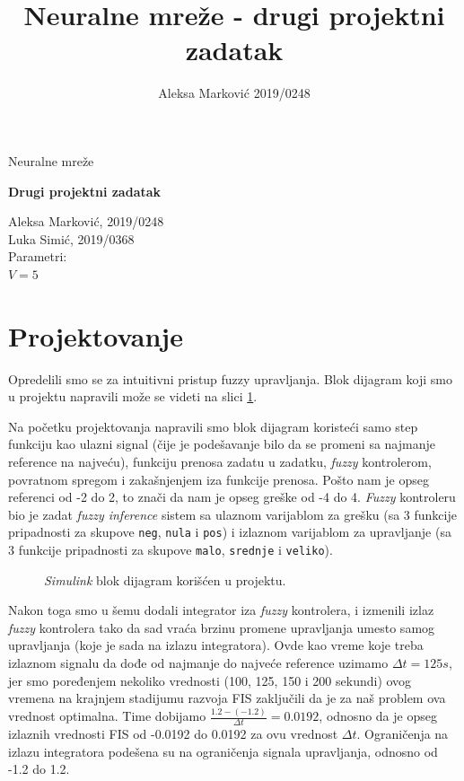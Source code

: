 \documentclass[10pt,a4paper,titlepage,croatian]{article}
\author{Aleksa Marković 2019/0248}
\title{Neuralne mreže - drugi projektni zadatak}
\begin{document}
\lstset{language=Python,breaklines=true} 
\begin{titlepage}
\begin{center}
{\Large Neuralne mreže \par}
\begin{huge}
\sc\textbf{Drugi projektni zadatak}
\par
\end{huge}
\vspace{1cm}
\begin{large}
Aleksa Marković, 2019/0248 \\
Luka Simić, 2019/0368
\\
\vspace{1cm}
Parametri:\\
\vspace{0.5cm}
$V = 5$
\end{large}
\end{center}

\end{titlepage}

\section{Projektovanje}
Opredelili smo se za intuitivni pristup fuzzy upravljanja. Blok dijagram koji smo u projektu napravili može se videti na slici \ref{Simulink}.

Na početku projektovanja napravili smo blok dijagram koristeći samo step funkciju kao ulazni signal (čije je podešavanje bilo da se promeni sa najmanje reference na najveću), funkciju prenosa zadatu u zadatku, \textit{fuzzy} kontrolerom, povratnom spregom i zakašnjenjem iza funkcije prenosa. Pošto nam je opseg referenci od -2 do 2, to znači da nam je opseg greške od -4 do 4. \textit{Fuzzy} kontroleru bio je zadat \textit{fuzzy inference} sistem sa ulaznom varijablom za grešku (sa 3 funkcije pripadnosti za skupove \texttt{neg}, \texttt{nula} i \texttt{pos}) i izlaznom varijablom za upravljanje (sa 3 funkcije pripadnosti za skupove \texttt{malo}, \texttt{srednje} i \texttt{veliko}).

\begin{figure}[H]
    \centering
    
    \caption{\textit{Simulink} blok dijagram korišćen u projektu.}
    \label{Simulink}
\end{figure}

Nakon toga smo u šemu dodali integrator iza \textit{fuzzy} kontrolera, i izmenili izlaz \textit{fuzzy} kontrolera tako da sad vraća brzinu promene upravljanja umesto samog upravljanja (koje je sada na izlazu integratora). Ovde kao vreme koje treba izlaznom signalu da dođe od najmanje do najveće reference uzimamo $\Delta t = 125s$, jer smo poređenjem nekoliko vrednosti (100, 125, 150 i 200 sekundi) ovog vremena na krajnjem stadijumu razvoja FIS zaključili da je za naš problem ova vrednost optimalna. Time dobijamo $\frac{1.2 - (-1.2)}{\Delta t} = 0.0192$, odnosno da je opseg izlaznih vrednosti FIS od -0.0192 do 0.0192 za ovu vrednost $\Delta t$. Ograničenja na izlazu integratora podešena su na ograničenja signala upravljanja, odnosno od -1.2 do 1.2.
\end{document}
